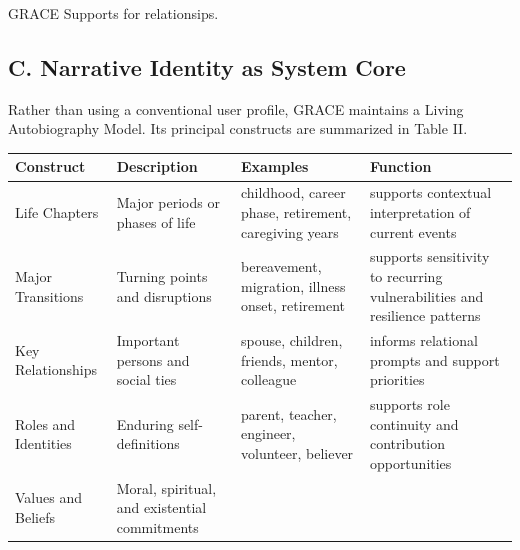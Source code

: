 \documentclass[
  journal,
]{IEEEtran}%
\newcounter{none} %
\begin{document}
GRACE Supports for relationsips.

\subsection{C. Narrative Identity as System
Core}\label{c.-narrative-identity-as-system-core}

Rather than using a conventional user profile, GRACE maintains a Living
Autobiography Model. Its principal constructs are summarized in Table
II.

\protect{}\label{tab-autobiography}
{\def\LTcaptype{none} %
\begin{longtable}[]{@{}
  >{\raggedright\arraybackslash}p{}
  >{\raggedright\arraybackslash}p{}
  >{\raggedright\arraybackslash}p{}
  >{\raggedright\arraybackslash}p{}@{}}
\toprule\noalign{}
\begin{minipage}[b]{\linewidth}\raggedright
Construct
\end{minipage} & \begin{minipage}[b]{\linewidth}\raggedright
Description
\end{minipage} & \begin{minipage}[b]{\linewidth}\raggedright
Examples
\end{minipage} & \begin{minipage}[b]{\linewidth}\raggedright
Function
\end{minipage} \\
\midrule\noalign{}
\endhead
\bottomrule\noalign{}
\endlastfoot
Life Chapters & Major periods or phases of life & childhood, career
phase, retirement, caregiving years & supports contextual interpretation
of current events \\
Major Transitions & Turning points and disruptions & bereavement,
migration, illness onset, retirement & supports sensitivity to recurring
vulnerabilities and resilience patterns \\
Key Relationships & Important persons and social ties & spouse,
children, friends, mentor, colleague & informs relational prompts and
support priorities \\
Roles and Identities & Enduring self-definitions & parent, teacher,
engineer, volunteer, believer & supports role continuity and
contribution opportunities \\
Values and Beliefs & Moral, spiritual, and existential commitments &

\end{longtable}}
\end{document}
